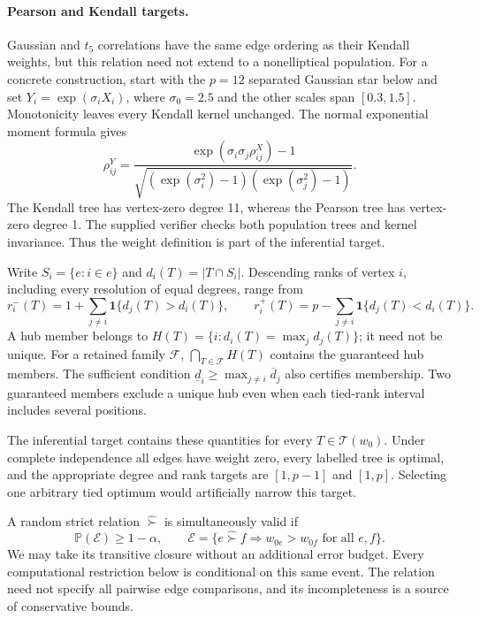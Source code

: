 \documentclass[11pt]{article}
\theoremstyle{plain}
\theoremstyle{definition}\newtheorem{remark}{Remark}\newtheorem{example}{Example}
\newcommand{\T}{\mathcal T}\newcommand{\Pp}{\mathbb P}\newcommand{\E}{\mathbb E}\newcommand{\ind}{\mathbf1}
\begin{document}
\paragraph{Pearson and Kendall targets.}
Gaussian and $t_5$ correlations have the same edge ordering as their Kendall weights, but this relation need not extend to a nonelliptical population. For a concrete construction, start with the $p=12$ separated Gaussian star below and set $Y_i=\exp(\sigma_i X_i)$, where $\sigma_0=2.5$ and the other scales span $[0.3,1.5]$. Monotonicity leaves every Kendall kernel unchanged. The normal exponential moment formula gives
\[
 \rho^{Y}_{ij}=\frac{\exp(\sigma_i\sigma_j\rho^X_{ij})-1}{\sqrt{(\exp(\sigma_i^2)-1)(\exp(\sigma_j^2)-1)}}.
\]
The Kendall tree has vertex-zero degree 11, whereas the Pearson tree has vertex-zero degree 1. The supplied verifier checks both population trees and kernel invariance. Thus the weight definition is part of the inferential target.

Write $S_i=\{e:i\in e\}$ and $d_i(T)=|T\cap S_i|$. Descending ranks of vertex $i$, including every resolution of equal degrees, range from
\begin{equation}\label{eq:ranks}
 r_i^-(T)=1+\sum_{j\ne i}\ind\{d_j(T)>d_i(T)\},\qquad
 r_i^+(T)=p-\sum_{j\ne i}\ind\{d_j(T)<d_i(T)\}.
\end{equation}
A hub member belongs to $H(T)=\{i:d_i(T)=\max_jd_j(T)\}$; it need not be unique. For a retained family $\mathcal F$, $\bigcap_{T\in\mathcal F}H(T)$ contains the guaranteed hub members. The sufficient condition $\underline d_i\ge\max_{j\ne i}\overline d_j$ also certifies membership. Two guaranteed members exclude a unique hub even when each tied-rank interval includes several positions.

The inferential target contains these quantities for every $T\in\T(w_0)$. Under complete independence all edges have weight zero, every labelled tree is optimal, and the appropriate degree and rank targets are $[1,p-1]$ and $[1,p]$. Selecting one arbitrary tied optimum would artificially narrow this target.

A random strict relation $\widehat{\succ}$ is simultaneously valid if
\begin{equation}\label{eq:event}
 \Pp(\mathcal E)\ge1-\alpha,\qquad
 \mathcal E=\{e\widehat{\succ}f\Longrightarrow w_{0e}>w_{0f}\text{ for all }e,f\}.
\end{equation}
We may take its transitive closure without an additional error budget. Every computational restriction below is conditional on this same event. The relation need not specify all pairwise edge comparisons, and its incompleteness is a source of conservative bounds.
\end{document}
